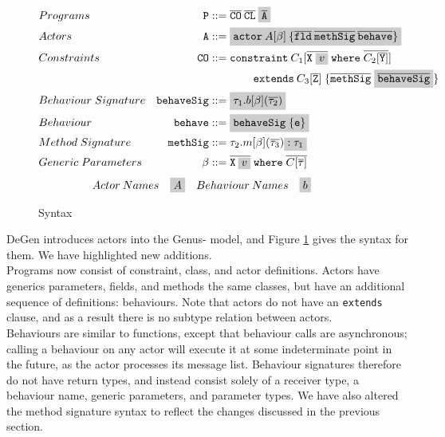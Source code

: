 \begin{figure}[H]
    \centering
    \begin{align*}
        &Programs & \texttt{P} &::= \overline{\texttt{CO}} \: \overline{\texttt{CL}} \: \highlight{\overline{\texttt{A}}} \\
        &Actors & \texttt{A} &::= \highlight{\texttt{actor} \: A[\beta] \: \{\overline{\texttt{fld}} \: \overline{\texttt{methSig}} \: \overline{\texttt{behave}}\}} \\
        &Constraints & \texttt{CO} &::= \texttt{constraint} \: C_1[\overline{\texttt{X} \; \highlight{v}} \; \texttt{where} \; \overline{C_2[\overline{\texttt{Y}}]}] \: \\ & & &\quad\quad\quad\quad\texttt{extends} \: C_3[\overline{\texttt{Z}}] \; \{ \overline{\texttt{methSig}} \; \highlight{\overline{\texttt{behaveSig}}} \} \\
        &Behaviour \; Signature & \texttt{behaveSig} &::= \highlight{\tau_1.b[\beta](\overline{\tau_2})} \\
        &Behaviour & \texttt{behave} &::=\highlight{ \texttt{behaveSig} \; \{ \texttt{e} \} }\\
        &Method \; Signature & \texttt{methSig} &::= \tau_2.m[\beta](\overline{\tau_3}) \highlight{: \tau_1} \\
        &Generic \; Parameters & \beta &::= \overline{\texttt{X} \:\highlight{v}} \; \texttt{where} \; \overline{C[\overline{\tau}]}
    \end{align*}
    \begin{align*}
        &Actor \: Names & &\highlight{A} & &Behaviour \: Names & &\highlight{b}
    \end{align*}
    \caption{Syntax}
    \label{fig:degen-actors}
\end{figure}

DeGen introduces actors into the Genus- model, and Figure \ref{fig:degen-actors} gives the syntax for them. We have highlighted new additions. \\

Programs now consist of constraint, class, and actor definitions. Actors have generics parameters, fields, and methods the same classes, but have an additional sequence of definitions: behaviours. Note that actors do not have an \texttt{extends} clause, and as a result there is no subtype relation between actors. \\

Behaviours are similar to functions, except that behaviour calls are asynchronous; calling a behaviour on any actor will execute it at some indeterminate point in the future, as the actor processes its message list. Behaviour signatures therefore do not have return types, and instead consist solely of a receiver type, a behaviour name, generic parameters, and parameter types. We have also altered the method signature syntax to reflect the changes discussed in the previous section. \\


